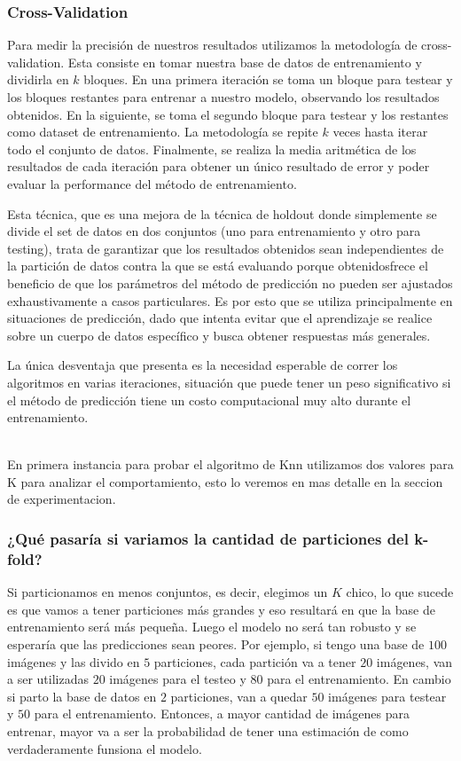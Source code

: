 \subsubsection {Cross-Validation}

Para medir la precisión de nuestros resultados utilizamos la metodología de cross-validation. Esta consiste en tomar nuestra base de datos de entrenamiento y dividirla en $k$ bloques. En una primera iteración se toma un bloque para testear y los bloques restantes para entrenar a nuestro modelo, observando los resultados obtenidos. En la siguiente, se toma el segundo bloque para testear y los restantes como dataset de entrenamiento. La metodología se repite $k$ veces hasta iterar todo el conjunto de datos. Finalmente, se realiza la media aritmética de los resultados de cada iteración para obtener un único resultado de error y poder evaluar la performance del método de entrenamiento.

Esta técnica, que es una mejora de la técnica de holdout donde simplemente se divide el set de datos en dos conjuntos (uno para entrenamiento y otro para testing), trata de garantizar que los resultados obtenidos sean independientes de la partición de datos contra la que se está evaluando porque obtenidosfrece el beneficio de que los parámetros del método de predicción no pueden ser ajustados exhaustivamente a casos particulares. Es por esto que se utiliza principalmente en situaciones de predicción, dado que intenta evitar que el aprendizaje se realice sobre un cuerpo de datos específico y busca obtener respuestas más generales.

La única desventaja que presenta es la necesidad esperable de correr los algoritmos en varias iteraciones, situación que puede tener un peso significativo si el método de predicción tiene un costo computacional muy alto durante el entrenamiento. 

\\
En primera instancia para probar el algoritmo de Knn utilizamos dos valores para K para analizar el comportamiento, esto lo veremos en mas detalle en la seccion de experimentacion.

\subsubsection{¿Qué pasaría si variamos la cantidad de particiones del k-fold?}

Si particionamos en menos conjuntos, es decir, elegimos un $K$ chico, lo que sucede es que vamos a tener particiones más grandes y eso resultará en que la base de entrenamiento será más pequeña. Luego el modelo no será tan robusto y se esperaría que las predicciones sean peores. Por ejemplo, si tengo una base de $100$ imágenes y las divido en $5$ particiones, cada partición va a tener $20$ imágenes, van a ser utilizadas $20$ imágenes para el testeo y $80$ para el entrenamiento. En cambio si parto la base de datos en $2$ particiones, van a quedar $50$ imágenes para testear y $50$ para el entrenamiento. Entonces, a mayor cantidad de imágenes para entrenar, mayor va a ser la probabilidad de tener una estimación de como verdaderamente funsiona el modelo.

